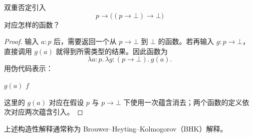 \documentclass[lang=cn,a4paper,fontset=none,zihao=false,10pt,openany,twoside]{beautybook}
\numberwithin{algorithm}{chapter}
\begin{document}
\begin{example}
双重否定引入
\[
 p\to\bigl((p\to\bot)\to\bot\bigr)
\]
对应怎样的函数？
\end{example}
\begin{proof}
输入 $a:p$ 后，需要返回一个从 $p\to\bot$ 到 $\bot$ 的函数。若再输入 $g:p\to\bot$，直接调用 $g(a)$ 就得到所需类型的结果。因此函数为
\[
 \lambda a{:}p.\,\lambda g{:}(p\to\bot).\,g(a).
\]
用伪代码表示：
\begin{algorithmic}[1]
  \State \Return $g(a)$
 \EndFunction
 \State \Return $f$
\EndFunction
\end{algorithmic}
这里的 $g(a)$ 对应在假设 $p$ 与 $p\to\bot$ 下使用一次蕴含消去；两个函数的定义依次对应两次蕴含引入。
\end{proof}

上述构造性解释通常称为 Brouwer--Heyting--Kolmogorov（BHK）解释。
\end{document}
